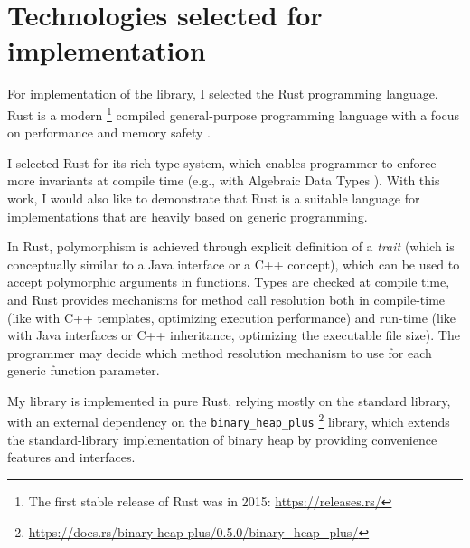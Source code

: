 \section{Technologies selected for implementation}

For implementation of the library, I selected the Rust programming language. Rust is a modern
\footnote{The first stable release of Rust was in 2015: \url{https://releases.rs/}}
compiled general-purpose programming language with a focus on performance and memory safety
\cite{klabnik2023rust}.

I selected Rust for its rich type system, which enables programmer to enforce more invariants
at compile time (e.g., with Algebraic Data Types \cite{klabnik2023rust}).
With this work, I would also like to demonstrate that Rust is a suitable language
for implementations that are heavily based on generic programming.

In Rust, polymorphism is achieved through explicit definition of a
\emph{trait} \cite{klabnik2023rust} (which is conceptually similar to a Java interface or a
C++ concept),
which can be used to accept polymorphic arguments in functions.
Types are checked at compile time, and Rust provides mechanisms for method call
resolution both in compile-time (like with C++ templates, optimizing execution performance)
and run-time (like with Java interfaces or C++ inheritance, optimizing the executable file
size). The programmer may decide which method resolution mechanism to use for each generic
function parameter.

My library is implemented in pure Rust, relying mostly on the standard library, with an
external dependency on the \texttt{binary\_heap\_plus}
\footnote{\url{https://docs.rs/binary-heap-plus/0.5.0/binary_heap_plus/}} library,
which extends the standard-library implementation of binary heap by providing convenience
features and interfaces.


